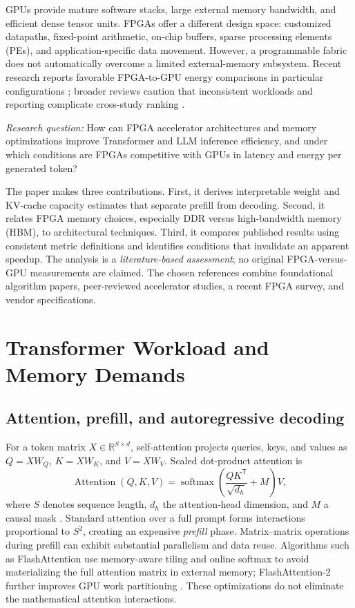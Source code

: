 \documentclass[conference,10pt]{IEEEtran}
\begin{document}
GPUs provide mature software stacks, large external memory bandwidth, and efficient dense tensor units. FPGAs offer a different design space: customized datapaths, fixed-point arithmetic, on-chip buffers, sparse processing elements (PEs), and application-specific data movement. However, a programmable fabric does not automatically overcome a limited external-memory subsystem. Recent research reports favorable FPGA-to-GPU energy comparisons in particular configurations \cite{zeng2024,huang2025}; broader reviews caution that inconsistent workloads and reporting complicate cross-study ranking \cite{blankestijn2026}.

\emph{Research question:} How can FPGA accelerator architectures and memory optimizations improve Transformer and LLM inference efficiency, and under which conditions are FPGAs competitive with GPUs in latency and energy per generated token?

The paper makes three contributions. First, it derives interpretable weight and KV-cache capacity estimates that separate prefill from decoding. Second, it relates FPGA memory choices, especially DDR versus high-bandwidth memory (HBM), to architectural techniques. Third, it compares published results using consistent metric definitions and identifies conditions that invalidate an apparent speedup. The analysis is a \emph{literature-based assessment}; no original FPGA-versus-GPU measurements are claimed. The chosen references combine foundational algorithm papers, peer-reviewed accelerator studies, a recent FPGA survey, and vendor specifications.

\section{Transformer Workload and Memory Demands}
\subsection{Attention, prefill, and autoregressive decoding}
For a token matrix $X\in\mathbb{R}^{S\times d}$, self-attention projects queries, keys, and values as $Q=XW_Q$, $K=XW_K$, and $V=XW_V$. Scaled dot-product attention is
\begin{equation}
\operatorname{Attention}(Q,K,V)=\operatorname{softmax}\!\left(\frac{QK^{\mathsf T}}{\sqrt{d_h}}+M\right)V,
\label{eq:attention}
\end{equation}
where $S$ denotes sequence length, $d_h$ the attention-head dimension, and $M$ a causal mask \cite{vaswani2017}. Standard attention over a full prompt forms interactions proportional to $S^2$, creating an expensive \emph{prefill} phase. Matrix--matrix operations during prefill can exhibit substantial parallelism and data reuse. Algorithms such as FlashAttention use memory-aware tiling and online softmax to avoid materializing the full attention matrix in external memory; FlashAttention-2 further improves GPU work partitioning \cite{dao2022,dao2024}. These optimizations do not eliminate the mathematical attention interactions.
\end{document}
